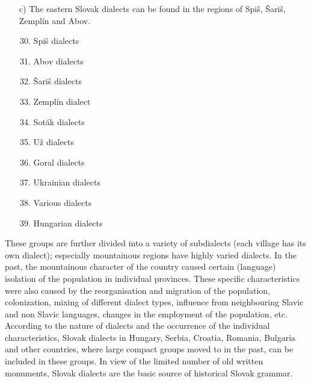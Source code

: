 \begin{multicols}{2}
\begin{itemize}
\item[c)] The eastern Slovak dialects can be found in the regions of Spiš, Šariš, Zemplín and Abov.

\begin{enumerate}
\setcounter{enumi}{29}
\item Spiš dialects
\item Abov dialects
\item Šariš dialects
\item Zemplín dialect
\item Soták dialects
\item Už dialects
\setcounter{enumi}{39}
\item Goral dialects
\item Ukrainian dialects
\item Various dialects
\item Hungarian dialects
\end{enumerate}
\end{itemize}

\medskip

These groups are further divided into a variety of subdialects (each village has its own dialect); especially mountainous regions have highly varied dialects. In the past, the mountainous character of the country caused certain (language) isolation of the population in individual provinces. These specific characteristics were also caused by the reorganisation and migration of the population, colonization, mixing of different dialect types, influence from neighbouring Slavic and non Slavic languages, changes in the employment of the population, etc. According to the nature of dialects and the occurrence of the individual characteristics, Slovak dialects in Hungary, Serbia, Croatia, Romania, Bulgaria and other countries, where large compact groups moved to in the past, can be included in these groups. In view of the limited number of old written monuments, Slovak dialects are the basic source of historical Slovak grammar.


\end{multicols}
